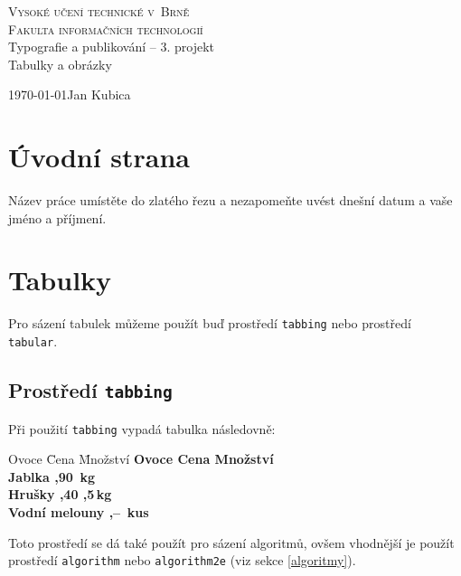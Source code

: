 \documentclass[11pt, a4paper]{article}
\author{Jan Kubica}
\begin{document}
	\begin{titlepage}
		\begin{center}
			\textsc{\Huge Vysoké učení technické v~Brně} \\[8pt]
			\textsc{\huge Fakulta informačních technologií} \\[16pt]
			{\LARGE Typografie a publikování -- 3. projekt} \\[6pt]
			{\Huge Tabulky a obrázky}
		\end{center}
		{\Large \today \hfill Jan Kubica}
		\vspace{4mm}
	\end{titlepage}


\section{Úvodní strana}

Název práce umístěte do zlatého řezu a nezapomeňte uvést dnešní datum a vaše jméno a příjmení.

\section{Tabulky}

Pro sázení tabulek můžeme použít buď prostředí \texttt{tabbing} nebo prostředí \texttt{tabular}.

\subsection{Prostředí \texttt{tabbing}}

Při použití \texttt{tabbing} vypadá tabulka následovně:
\begin{tabbing}
    Ovoce \hspace{4.3em} \= Cena \hspace{1.2em}\= Množství \kill
    \bfseries Ovoce \>
    \bfseries Cena \>
    \bfseries Množství \\
    Jablka ,90 \,kg \\
    Hrušky ,40 ,5\,kg\\
    Vodní melouny ,-- \,kus
\end{tabbing}

\vspace{5mm}

\noindent Toto prostředí se dá také použít pro sázení algoritmů, ovšem vhodnější je použít 
prostředí \texttt{algorithm} nebo \texttt{algorithm2e} (viz sekce \ref{algoritmy}).
\end{document}
